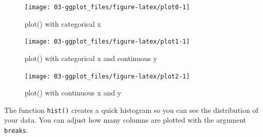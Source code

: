 \documentclass[
  oneside]{book}
\newenvironment{Shaded}{\begin{snugshade}}{\end{snugshade}}
\newcommand{\AttributeTok}[1]{\textcolor[rgb]{0.77,0.63,0.00}{#1}}
\newcommand{\DecValTok}[1]{\textcolor[rgb]{0.00,0.00,0.81}{#1}}
\newcommand{\FunctionTok}[1]{\textcolor[rgb]{0.00,0.00,0.00}{#1}}
\newcommand{\NormalTok}[1]{#1}
\newcommand{\SpecialCharTok}[1]{\textcolor[rgb]{0.00,0.00,0.00}{#1}}
\begin{document}
\begin{figure}

{\centering \texttt{[image: 03-ggplot\_files/figure-latex/plot0-1]} 

}

\caption{plot() with categorical x}\label{fig:plot0}
\end{figure}

\begin{Shaded}
\end{Shaded}

\begin{figure}

{\centering \texttt{[image: 03-ggplot\_files/figure-latex/plot1-1]} 

}

\caption{plot() with categorical x and continuous y}\label{fig:plot1}
\end{figure}

\begin{Shaded}
\end{Shaded}

\begin{figure}

{\centering \texttt{[image: 03-ggplot\_files/figure-latex/plot2-1]} 

}

\caption{plot() with continuous x and y}\label{fig:plot2}
\end{figure}

The function \texttt{hist()} creates a quick histogram so you can see the distribution of your data. You can adjust how many columns are plotted with the argument \texttt{breaks}.

\begin{Shaded}
\end{Shaded}
\end{document}
